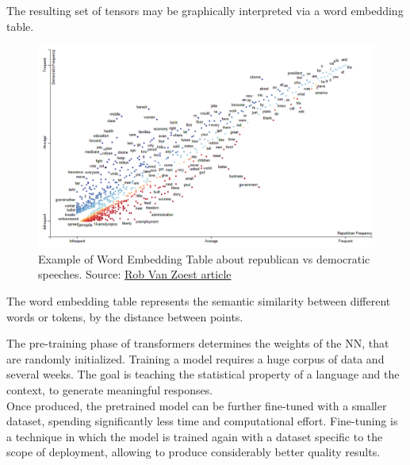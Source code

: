 \documentclass[12pt]{article}
\begin{document}
\vspace{2mm}

The resulting set of tensors may be graphically interpreted via a word embedding table.
    \begin{figure}[H]
    \centering
            \includegraphics[width=1\textwidth]{WordEmbeddingTableEx.png}
    \caption[Example of Word Embedding Table]{Example of Word Embedding Table about republican vs democratic speeches. Source: \href{https://www.innerdoc.com/periodic-table-of-nlp-tasks/78-word-embedding-visualization/}{Rob Van Zoest article}}
    \end{figure}
\noindent The word embedding table represents the semantic similarity between different words or tokens, by the distance between points.


\vspace{2mm}

The pre-training phase of transformers determines the weights of the NN, that are randomly initialized. Training a model requires a huge corpus of data and several weeks. The goal is teaching the statistical property of a language and the context, to generate meaningful responses.\\ 
Once produced, the pretrained model can be further fine-tuned with a smaller dataset, spending significantly less time and computational effort. Fine-tuning is a technique in which the model is trained again with a dataset specific to the scope of deployment, allowing to produce considerably better quality results.\\
\end{document}
